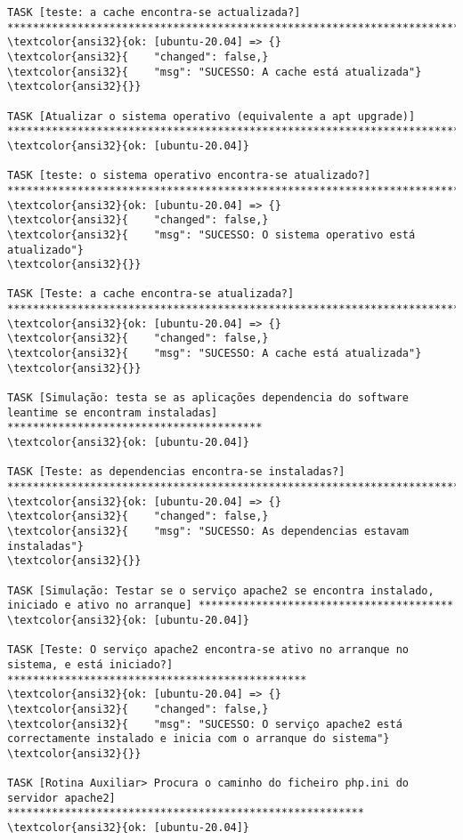 \documentclass{scrartcl}
\begin{document}
\begin{Verbatim}
TASK [teste: a cache encontra-se actualizada?] *******************************************************************************************
\textcolor{ansi32}{ok: [ubuntu-20.04] => {}
\textcolor{ansi32}{    "changed": false,}
\textcolor{ansi32}{    "msg": "SUCESSO: A cache está atualizada"}
\textcolor{ansi32}{}}

TASK [Atualizar o sistema operativo (equivalente a apt upgrade)] *************************************************************************
\textcolor{ansi32}{ok: [ubuntu-20.04]}

TASK [teste: o sistema operativo encontra-se atualizado?] ********************************************************************************
\textcolor{ansi32}{ok: [ubuntu-20.04] => {}
\textcolor{ansi32}{    "changed": false,}
\textcolor{ansi32}{    "msg": "SUCESSO: O sistema operativo está atualizado"}
\textcolor{ansi32}{}}

TASK [Teste: a cache encontra-se atualizada?] ********************************************************************************************
\textcolor{ansi32}{ok: [ubuntu-20.04] => {}
\textcolor{ansi32}{    "changed": false,}
\textcolor{ansi32}{    "msg": "SUCESSO: A cache está atualizada"}
\textcolor{ansi32}{}}

TASK [Simulação: testa se as aplicações dependencia do software leantime se encontram instaladas] ****************************************
\textcolor{ansi32}{ok: [ubuntu-20.04]}

TASK [Teste: as dependencias encontra-se instaladas?] ************************************************************************************
\textcolor{ansi32}{ok: [ubuntu-20.04] => {}
\textcolor{ansi32}{    "changed": false,}
\textcolor{ansi32}{    "msg": "SUCESSO: As dependencias estavam instaladas"}
\textcolor{ansi32}{}}

TASK [Simulação: Testar se o serviço apache2 se encontra instalado, iniciado e ativo no arranque] ****************************************
\textcolor{ansi32}{ok: [ubuntu-20.04]}

TASK [Teste: O serviço apache2 encontra-se ativo no arranque no sistema, e está iniciado?] ***********************************************
\textcolor{ansi32}{ok: [ubuntu-20.04] => {}
\textcolor{ansi32}{    "changed": false,}
\textcolor{ansi32}{    "msg": "SUCESSO: O serviço apache2 está correctamente instalado e inicia com o arranque do sistema"}
\textcolor{ansi32}{}}

TASK [Rotina Auxiliar> Procura o caminho do ficheiro php.ini do servidor apache2] ********************************************************
\textcolor{ansi32}{ok: [ubuntu-20.04]}


\end{Verbatim}
\end{document}
